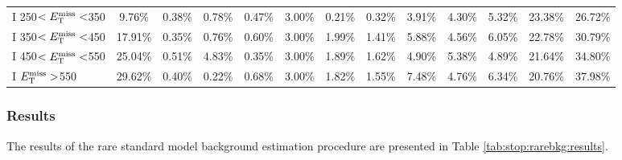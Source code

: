 \begin{table}
\begin{tabular}{|l|cccccccccccc|}
 I 250$<E_\text{T}^\text{miss}<$350 & 9.76\%  & 0.38\%  & 0.78\%  & 0.47\%  & 3.00\%  & 0.21\%  & 0.32\%  & 3.91\%  & 4.30\%  & 5.32\%  & 23.38\% & 26.72\% \\
 I 350$<E_\text{T}^\text{miss}<$450 & 17.91\% & 0.35\%  & 0.76\%  & 0.60\%  & 3.00\%  & 1.99\%  & 1.41\%  & 5.88\%  & 4.56\%  & 6.05\%  & 22.78\% & 30.79\% \\
 I 450$<E_\text{T}^\text{miss}<$550 & 25.04\% & 0.51\%  & 4.83\%  & 0.35\%  & 3.00\%  & 1.89\%  & 1.62\%  & 4.90\%  & 5.38\%  & 4.89\%  & 21.64\% & 34.80\% \\
 I $E_\text{T}^\text{miss}>$550     & 29.62\% & 0.40\%  & 0.22\%  & 0.68\%  & 3.00\%  & 1.82\%  & 1.55\%  & 7.48\%  & 4.76\%  & 6.34\%  & 20.76\% & 37.98\% \\
\hline
\end{tabular}
\end{table}

\subsubsection{Results}
\label{sssec:stop:rarebkg:results}

The results of the rare standard model background estimation procedure
are presented in Table \ref{tab:stop:rarebkg:results}.

